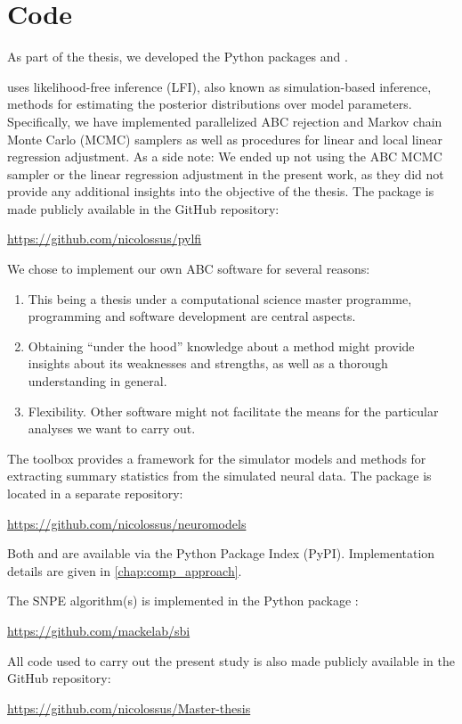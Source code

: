 \section{Code}

As part of the thesis, we developed the Python packages  and .

 uses likelihood-free inference (LFI), also known as simulation-based inference, methods for estimating the posterior distributions over model parameters. Specifically, we have implemented parallelized ABC rejection and Markov chain Monte Carlo (MCMC) samplers as well as procedures for linear and local linear regression adjustment. As a side note: We ended up not using the ABC MCMC sampler or the linear regression adjustment in the present work, as they did not provide any additional insights into the objective of the thesis. The package is made publicly available in the GitHub repository:

\begin{center}
    \url{https://github.com/nicolossus/pylfi}
\end{center}

We chose to implement our own ABC software for several reasons: 
\begin{enumerate}
    \item This being a thesis under a computational science master programme, programming and software development are central aspects. 
    \item Obtaining “under the hood” knowledge about a method might provide insights about its weaknesses and strengths, as well as a thorough understanding in general. 
    \item Flexibility. Other software might not facilitate the means for the particular analyses we want to carry out. 
\end{enumerate}

The  toolbox provides a framework for the simulator models and methods for extracting summary statistics from the simulated neural data. The package is located in a separate repository:

\begin{center}
    \url{https://github.com/nicolossus/neuromodels}
\end{center}

Both  and  are available via the Python Package Index (PyPI). Implementation details are given in \cref{chap:comp_approach}.

The SNPE algorithm(s) is implemented in the  Python package \cite{sbi}: 

\begin{center}
    \url{https://github.com/mackelab/sbi}
\end{center}

All code used to carry out the present study is also made publicly available in the GitHub repository:

\begin{center}
    \url{https://github.com/nicolossus/Master-thesis}
\end{center}
